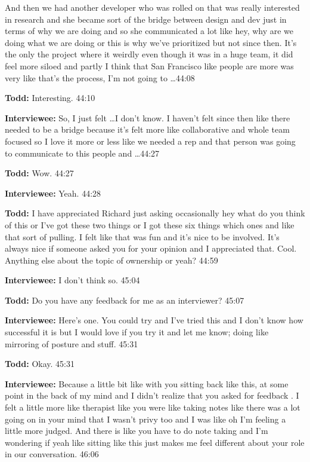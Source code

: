 And then we had another developer who was rolled on that was really interested in research and she became sort of the bridge between design and dev just in terms of why we are doing and so she communicated a lot like hey, why are we doing what we are doing or this is why we've prioritized but not since then.  It's the only the project where it weirdly even though it was in a huge team, it did feel more siloed and partly I think that San Francisco like people are more was very like that's the process, I'm not going to \ldots44:08

\textbf{Todd:} Interesting.  44:10

\textbf{Interviewee:} So, I just felt \ldots I don't know.  I haven't felt since then like there needed to be a bridge because it's felt more like collaborative and whole team focused so I love it more or less like we needed a rep and that person was going to communicate to this people and \ldots  44:27

\textbf{Todd:} Wow.  44:27

\textbf{Interviewee:} Yeah.  44:28

\textbf{Todd:} I have appreciated Richard just asking occasionally hey what do you think of this or I've got these two things or I got these six things which ones and like that sort of pulling.  I felt like that was fun and it's nice to be involved.  It's always nice if someone asked you for your opinion and I appreciated that.  Cool.  Anything else about the topic of ownership or yeah?  44:59

\textbf{Interviewee:} I don't think so.  45:04

\textbf{Todd:} Do you have any feedback for me as an interviewer?  45:07

\textbf{Interviewee:} Here's one.  You could try and I've tried this and I don't know how successful it is but I would love if you try it and let me know; doing like mirroring of posture and stuff.  45:31

\textbf{Todd:} Okay.  45:31

\textbf{Interviewee:} Because a little bit like with you sitting back like this, at some point in the back of my mind and I didn't realize that you asked for feedback .  I felt a little more like therapist like you were like taking notes like there was a lot going on in your mind that I wasn't privy too and I was like oh I'm feeling a little more judged.  And there is like you have to do note taking and I'm wondering if yeah like sitting like this just makes me feel different about your role in our conversation.  46:06

